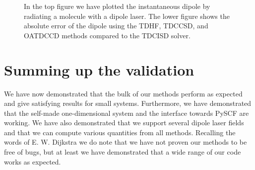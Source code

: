 \begin{figure}
            \caption{In the top figure we have plotted the instantaneous
            dipole by radiating a  molecule with a dipole laser.
            The lower figure shows the absolute error of the dipole using the
            TDHF, TDCCSD, and OATDCCD methods compared to the TDCISD solver.}
            \label{fig:dipole-moment-li}
        \end{figure}

    \section{Summing up the validation}
        We have now demonstrated that the bulk of our methods perform as
        expected and give satisfying results for small systems.
        Furthermore, we have demonstrated that the self-made one-dimensional
        system and the interface towards PySCF \cite{pyscf} are working.
        We have also demonstrated that we support several dipole laser fields and
        that we can compute various quantities from all methods.
        Recalling the words of E. W. Dijkstra we do note that we have not proven
        our methods to be free of bugs, but at least we have demonstrated that a
        wide range of our code works as expected.

\clearemptydoublepage
